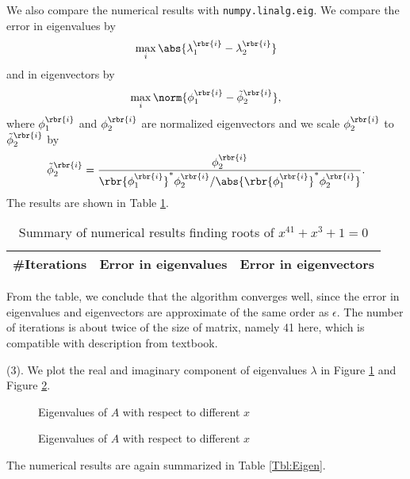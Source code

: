 \documentclass[english, nochinese]{pnote}
\begin{document}
We also compare the numerical results with \verb"numpy.linalg.eig". We compare the error in eigenvalues by
\begin{equation}
\max_i \abs{ \lambda_1^{\rbr{i}} - \lambda_2^{\rbr{i}} }
\end{equation}
and in eigenvectors by
\begin{equation}
\max_i \norm{ \phi_1^{\rbr{i}} - \tilde{\phi}_2^{\rbr{i}} },
\end{equation}
where $\phi_1^{\rbr{i}}$ and $\phi_2^{\rbr{i}}$ are normalized eigenvectors and we scale $\phi_2^{\rbr{i}}$ to $\tilde{\phi}_2^{\rbr{i}}$ by
\begin{equation}
\tilde{\phi}_2^{\rbr{i}} = \frac{ \phi_2^{\rbr{i}} }{ \rbr{\phi_1^{\rbr{i}}}^{\ast} \phi_2^{\rbr{i}} / \abs{ \rbr{\phi_1^{\rbr{i}}}^{\ast} \phi_2^{\rbr{i}} } }.
\end{equation}
The results are shown in Table \ref{Tbl:Root}.

\begin{table}
\centering
\begin{tabular}{|c|c|c|}
\hline
\#Iterations & Error in eigenvalues & Error in eigenvectors \\
\hline

\end{tabular}
\caption{Summary of numerical results finding roots of $ x^{41} + x^3 + 1 = 0 $}
\label{Tbl:Root}
\end{table}

From the table, we conclude that the algorithm converges well, since the error in eigenvalues and eigenvectors are approximate of the same order as $\epsilon$. The number of iterations is about twice of the size of matrix, namely 41 here, which is compatible with description from textbook.

(3). We plot the real and imaginary component of eigenvalues $\lambda$ in Figure \ref{Fig:EigenReal} and Figure \ref{Fig:EigenImag}.

\begin{figure}
\centering

\caption{Eigenvalues of $A$ with respect to different $x$}
\label{Fig:EigenReal}
\end{figure}

\begin{figure}
\centering

\caption{Eigenvalues of $A$ with respect to different $x$}
\label{Fig:EigenImag}
\end{figure}

The numerical results are again summarized in Table \ref{Tbl:Eigen}.
\end{document}
